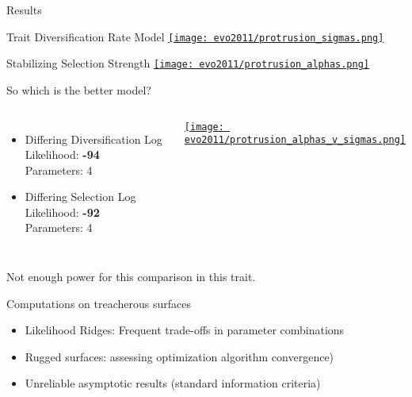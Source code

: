 \documentclass[final,hyperref={pdfpagelabels=false},xcolor=svgnames]{beamer}
\begin{document}
\begin{frame}[t]
\begin{columns}[t]
\begin{column}{.2\paperwidth} 
	{\LARGE Results }

  \begin{center}
    Trait Diversification Rate Model 
    \href{http://www.flickr.com/photos/cboettig/5842718829}{
    \texttt{[image: evo2011/protrusion\_sigmas.png]}}

    Stabilizing Selection Strength 
    \href{http://www.flickr.com/photos/cboettig/5842718565}{
    \texttt{[image: evo2011/protrusion\_alphas.png]}}

  \end{center}

  \begin{block}{So which is the better model?}
  \begin{columns}
  \begin{itemize}
    \item Differing Diversification Log Likelihood: \textbf{-94} \\  Parameters: 4
    \item Differing Selection Log Likelihood: \textbf{-92} \\Parameters: 4
  \end{itemize}
    \begin{center}
      \href{http://www.flickr.com/photos/cboettig/5842718351}{
      \texttt{[image: evo2011/protrusion\_alphas\_v\_sigmas.png]}}
    \end{center}
  \end{columns}
  \vspace{1cm}
  Not enough power for this comparison in this trait.\\  
  \end{block}

\vspace{1.9in}
{\Large Computations on treacherous surfaces}
\large
\begin{itemize}
  \item Likelihood Ridges: Frequent trade-offs in parameter combinations
  \item Rugged surfaces: assessing optimization algorithm convergence)
  \item Unreliable asymptotic results (standard information criteria)
\end{itemize}
\end{column}


\end{columns}
\end{frame}
\end{document}
